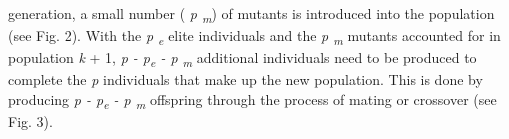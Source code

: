 \begin{multicols}{2}
generation,\allowbreak{} a small number (\allowbreak{} \textit{p \textsubscript{m}})\allowbreak{} of mutants is introduced into the population (\allowbreak{}see Fig.\allowbreak{} 2)\allowbreak{}.\allowbreak{} With the \textit{p \textsubscript{e}} elite individuals and the \textit{p \textsubscript{m}} mutants accounted for in population \textit{k} +\allowbreak{} 1,\allowbreak{} \textit{p -\allowbreak{} p\textsubscript{e} -\allowbreak{} p \textsubscript{m}} additional individuals need to be produced to complete the \textit{p} individuals that make up the new population.\allowbreak{} This is done by producing \textit{p -\allowbreak{} p\textsubscript{e} -\allowbreak{} p \textsubscript{m}} offspring through the process of mating or crossover (\allowbreak{}see Fig.\allowbreak{} 3)\allowbreak{}.\allowbreak{}
\par
{
}
\par


\end{multicols}
